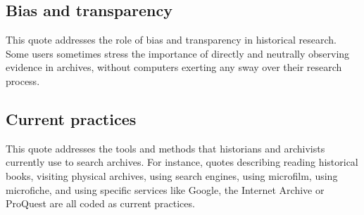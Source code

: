 \documentclass[acmsmall,screen,review,anonymous]{acmart}
\begin{document}
\subsection*{Bias and transparency}
This quote addresses the role of bias and transparency in historical research. Some users sometimes stress the importance of directly and neutrally observing evidence in archives, without computers exerting any sway over their research process. 

\subsection*{Current practices}
This quote addresses the tools and methods that historians and archivists currently use to search archives. For instance, quotes describing reading historical books, visiting physical archives, using search engines, using microfilm, using microfiche, and using specific services like Google, the Internet Archive or ProQuest are all coded as current practices. 
\end{document}
